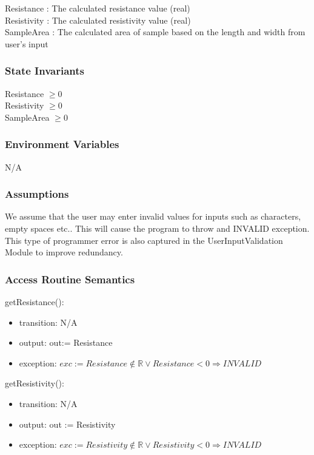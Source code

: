 \documentclass[12pt, titlepage]{article}
\begin{document}
Resistance : The calculated resistance value (real)\\
Resistivity : The calculated resistivity value (real) \\
SampleArea : The calculated area of sample based on the length and width from user's input

\subsubsection{State Invariants}

Resistance $\geq 0$ \\
Resistivity $\geq 0$ \\
SampleArea $\geq 0$

\subsubsection{Environment Variables}

N/A

\subsubsection{Assumptions}

We assume that the user may enter invalid values for inputs such as characters, empty spaces etc..
This will cause the program to throw and INVALID exception. This type of programmer error is also 
captured in the UserInputValidation Module to improve redundancy.

\subsubsection{Access Routine Semantics}

\noindent getResistance():
\begin{itemize}
\item transition: N/A
\item output: out:= Resistance
\item exception: $exc:= Resistance \notin \mathbb{R} \lor Resistance < 0  \Rightarrow INVALID$
\end{itemize}

\noindent getResistivity():
\begin{itemize}
\item transition: N/A
\item output: out := Resistivity
\item exception: $exc:= Resistivity \notin \mathbb{R} \lor Resistivity < 0  \Rightarrow INVALID$
\end{itemize}
\end{document}
